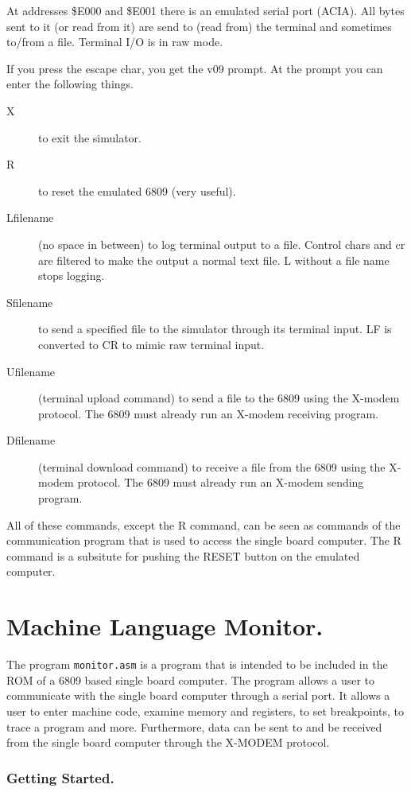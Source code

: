 At addresses \$E000 and \$E001 there is an emulated serial port (ACIA). All
bytes sent to it (or read from it) are send to (read from) the terminal and
sometimes to/from a file.
Terminal I/O is in raw mode.

If you press the escape char, you get the v09 prompt. At the prompt you
can enter the following things.
\begin{description}
\item[X]        to exit the simulator.
\item[R]         to reset the emulated 6809 (very useful).
\item[Lfilename] (no space in between) to log terminal output to a file.
           Control chars and cr are filtered to make the output a normal
           text file. L without a file name stops logging.
\item[Sfilename] to send a specified file to the simulator through its terminal
           input. LF is converted to CR to mimic raw terminal input.
\item[Ufilename] (terminal upload command) to send a file to the 6809 using the
	   X-modem protocol. The 6809 must already run an X-modem receiving
           program.
\item[Dfilename] (terminal download command) to receive a file from the 6809 using
           the X-modem protocol. The 6809 must already run an X-modem
	   sending program.
\end{description}
All of these commands, except the R command, can be seen as commands of the
communication program that is used to access the single board computer. 
The R command is a subsitute for pushing the RESET button on the emulated
computer.

\chapter{Machine Language Monitor.}

The program {\tt monitor.asm} is a program that is intended to be included
in the ROM of a 6809 based single board computer. The program allows a user
to communicate with the single board computer through a serial port. It
allows a user to enter machine code, examine memory and registers, to set
breakpoints, to trace a program and more. Furthermore, data can be sent to
and be received from the single board computer through the X-MODEM protocol.

\subsection{Getting Started.}

